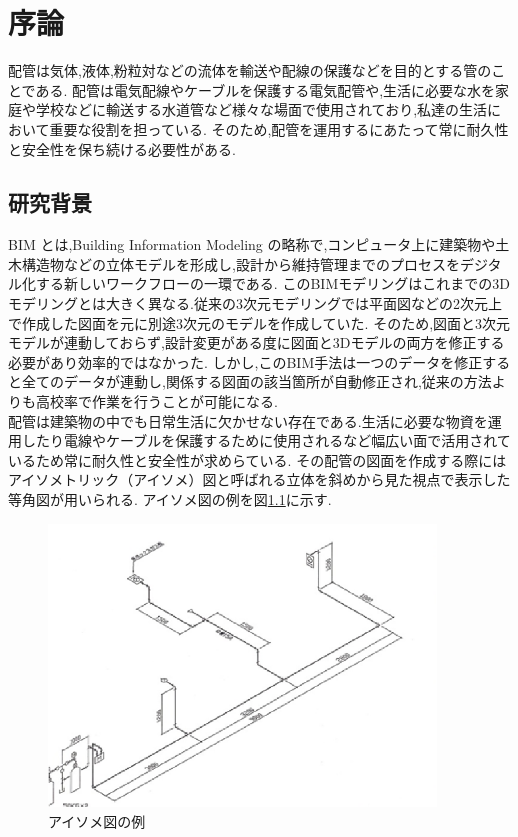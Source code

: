 \chapter{序論}
配管は気体,液体,粉粒対などの流体を輸送や配線の保護などを目的とする管のことである.
配管は電気配線やケーブルを保護する電気配管や,生活に必要な水を家庭や学校などに輸送する水道管など様々な場面で使用されており,私達の生活において重要な役割を担っている.
そのため,配管を運用するにあたって常に耐久性と安全性を保ち続ける必要性がある. \\

\section{研究背景}
BIM とは,Building Information Modeling の略称で,コンピュータ上に建築物や土木構造物などの立体モデルを形成し,設計から維持管理までのプロセスをデジタル化する新しいワークフローの一環である.
このBIMモデリングはこれまでの3Dモデリングとは大きく異なる.従来の3次元モデリングでは平面図などの2次元上で作成した図面を元に別途3次元のモデルを作成していた.
そのため,図面と3次元モデルが連動しておらず,設計変更がある度に図面と3Dモデルの両方を修正する必要があり効率的ではなかった.
しかし,このBIM手法は一つのデータを修正すると全てのデータが連動し,関係する図面の該当箇所が自動修正され,従来の方法よりも高校率で作業を行うことが可能になる.\\
配管は建築物の中でも日常生活に欠かせない存在である.生活に必要な物資を運用したり電線やケーブルを保護するために使用されるなど幅広い面で活用されているため常に耐久性と安全性が求めらている.
その配管の図面を作成する際にはアイソメトリック（アイソメ）図と呼ばれる立体を斜めから見た視点で表示した等角図が用いられる.
アイソメ図の例を図\ref{fig:f1}に示す.
\begin{figure}[htbt]
	\centering
	 \includegraphics[height=75mm]{Figure/ex_iso.eps}
	 \caption{アイソメ図の例}
	 \label{fig:f1}
\end{figure}


